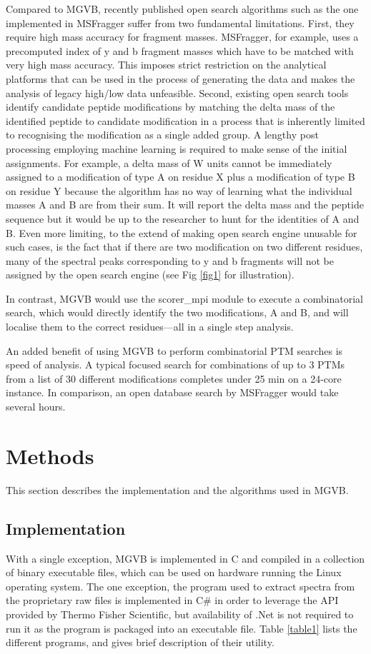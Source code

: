 \documentclass[default]{sn-jnl}
\theoremstyle{thmstyleone}%
\theoremstyle{thmstyletwo}%
\theoremstyle{thmstylethree}%
\begin{document}
Compared to MGVB, recently published open search algorithms such as the one implemented in MSFragger \cite {RN3} suffer from two fundamental limitations. First, they require high mass accuracy for fragment masses. MSFragger, for example, uses a precomputed index of y and b fragment masses which have to be matched with very high mass accuracy. This imposes  strict restriction on the analytical platforms that can be used in the process of generating the data and makes the analysis of legacy high/low data unfeasible. Second, existing open search tools identify candidate peptide modifications by matching the delta mass of the identified peptide to candidate modification in a process that is inherently limited to recognising the modification as a single added group. A lengthy post processing employing machine learning is required to make sense of the initial assignments. For example, a delta mass of W units cannot be immediately assigned to a modification of type A on residue X plus a modification of type B on residue Y because the algorithm has no way of learning what the individual  masses A and B are from their sum. It will report the delta mass and the peptide sequence but it would be up to the researcher to hunt for the identities of A and B. Even more limiting, to the extend of making open search engine unusable for such cases, is the fact that if there are two modification on two different residues, many of the spectral peaks corresponding to y and b fragments will not be assigned by the open search engine (see Fig \ref {fig1} for illustration).

In contrast, MGVB would use the scorer\_mpi module to execute a combinatorial search, which would directly identify the two modifications, A and B, and will localise them to the correct residues—all in a single step analysis. 

An added benefit of using MGVB to perform combinatorial PTM searches is speed of analysis. A typical focused search for combinations of up to 3 PTMs from a list of 30 different modifications completes under 25 min on a 24-core instance. In comparison, an open database search by MSFragger would take several hours.

\section{Methods}\label{sec3}

This section describes the implementation and the algorithms used in MGVB. 

\subsection{Implementation}\label{subsec1}
With a single exception, MGVB is implemented in C and compiled in a collection of binary executable files, which can be used on hardware running the Linux operating system. The one exception, the program used to extract spectra from the proprietary raw files is implemented in C\# in order to leverage the API provided by Thermo Fisher Scientific, but availability of .Net is not required to run it as the program is packaged into an executable file. Table \ref{table1} lists the different programs, and gives brief description of their utility. 
\end{document}

